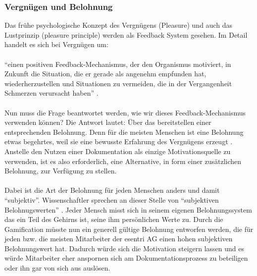 \documentclass[a4paper,12pt]{scrartcl}
\begin{document}
\subsubsection{Vergnügen und Belohnung}
Das frühe psychologische Konzept des Vergnügens (Pleasure) und auch das Lustprinzip (pleasure principle) werden als Feedback System gesehen. Im Detail handelt es sich bei Vergnügen um:
\\\\
\enquote{einen positiven Feedback-Mechanismus, der den Organismus motiviert, in Zukunft die Situation, die er gerade als angenehm empfunden hat, wiederherzustellen und Situationen zu vermeiden, die in der Vergangenheit Schmerzen verursacht haben} \cite{Freud2015}.
\\\\
Nun muss die Frage beantwortet werden, wie wir dieses Feedback-Mechanismus verwenden können? Die Antwort lautet: Über das bereitstellen einer entsprechenden Belohnung. Denn für die meisten Menschen ist eine Belohnung etwas begehrtes, weil sie eine bewusste Erfahrung des Vergnügens erzeugt \cite{Berridge2009}. Anstelle den Nutzen einer Dokumentation als einzige Motivationsquelle zu verwenden, ist es also erforderlich, eine Alternative, in form einer zusätzlichen Belohnung, zur Verfügung zu stellen.
\\\\
Dabei ist die Art der Belohnung für jeden Menschen anders und damit \enquote{subjektiv}. Wissenschaftler sprechen an dieser Stelle von \enquote{subjektiven Belohnugswerten} \cite{Bonhoeffer2011}. Jeder Mensch misst sich in seinem eigenen Belohnungssystem das ein Teil des Gehirns ist, seine ihm persönlichen Werte zu. Durch die Gamification müsste nun ein generell gültige Belohnung entworfen werden, die für jeden bzw. die meisten Mitarbeiter der esentri AG einen hohen subjektiven Belohnungswert hat. Dadurch würde sich die Motivation steigern lassen und es würde Mitarbeiter eher anspornen sich am Dokumentationsprozess zu beteiligen oder ihn gar von sich aus auslösen.
\end{document}
